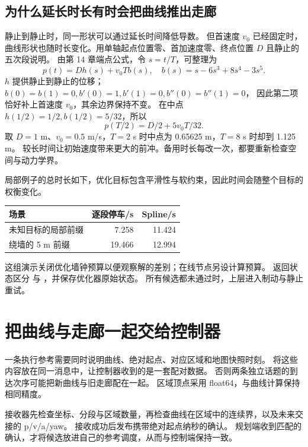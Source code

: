 \subsection{为什么延长时长有时会把曲线推出走廊}
静止到静止时，同一形状可以通过延长时间降低导数。
但首速度 $v_0$ 已经固定时，曲线形状也随时长变化。用单轴起点位置零、首加速度零、终点位置 $D$ 且静止的五次段说明。
由第 14 章端点公式，令 $s=t/T$，可整理为
\[
 p(t)=D h(s)+v_0T b(s),\quad
 b(s)=s-6s^3+8s^4-3s^5.
\]
$h$ 提供静止到静止的位移；$b(0)=b(1)=0,b'(0)=1,b'(1)=0,b''(0)=b''(1)=0$，
因此第二项恰好补上首速度 $v_0$，其余边界保持不变。
在中点 $h(1/2)=1/2,b(1/2)=5/32$，所以
\[
 p(T/2)=D/2+5v_0T/32.
\]
取 $D=1$ m、$v_0=0.5$ m/s，$T=2$ s 时中点为 0.65625 m，$T=8$ s 时却到 1.125 m。
较长时间让初始速度带来更大的前冲。备用时长每改一次，都要重新检查空间与动力学界。

局部例子的总时长如下，优化目标包含平滑性与软约束，因此时间会随整个目标的权衡变化。
\begin{center}\small
\begin{tabular}{lrr}\toprule
场景 & 逐段停车/s & Spline/s\\\midrule
未知目标的局部前缀 & 7.258 & 11.424\\
绕墙的 5 m 前缀 & 19.466 & 12.994\\\bottomrule
\end{tabular}\end{center}
这组演示关闭优化墙钟预算以便观察解的差别；在线节点另设计算预算。
返回状态区分  与 ，并保存优化器原始状态。
所有候选都未通过时，上层进入制动与静止重试。

\section{把曲线与走廊一起交给控制器}
一条执行参考需要同时说明曲线、绝对起点、对应区域和地图快照时刻。
 将这些内容放在同一消息中，让控制器收到的是一套配对数据。
否则两条独立话题的到达次序可能把新曲线与旧走廊配在一起。
区域顶点采用 float64，与曲线计算保持相同精度。

接收器先检查坐标、分段与区域数量，再检查曲线在区域中的连续界，以及未来交接的 p/v/a/yaw。
接收成功后发布携带绝对起点纳秒的确认。
规划端收到匹配的确认，才将候选放进自己的参考调度，从而与控制端保持一致。

